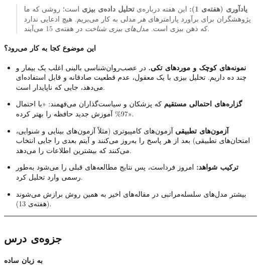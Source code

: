 \begin{quote}
\textbf{یادآوری (هفته‌ی 1):} این هفته درباره‌ی \textbf{تحلیل داده‌ی بیزی}
است؛ روشی که ما پژوهشگران برای برآورد پارامترهای \emph{هر} مدلی به کار
می‌بریم. هیچ ادعایی ندارد که ذهن بیزی است. \emph{مدل‌های بیزی شناخت} در
هفته‌ی 15 می‌آیند.
\end{quote}

\paragraph{این موضوع کجا به کار می‌رود؟}

\begin{itemize}
\tightlist
\item
  \textbf{نمونه‌های کوچک و موردهای تکی.} در عصب‌روان‌شناسی بالینی اغلب یک
  بیمار و چند ده  داریم. تحلیل بیزی با یک  معقول،
  عدم قطعیت صادقانه و قابل استفاده‌ای می‌دهد، جایی که  ناپایدار
  است.
\item
  \textbf{گزاره‌های احتمالی مستقیم} که پزشکان و سیاست‌گذاران می‌فهمند: «با
  احتمال 97\% آموزش جدید حافظه را بهتر کرده».
\item
  \textbf{آزمون‌های تطبیقی } آزمون‌های کامپیوتری
  (مثلاً آزمون‌های بینایی و شنوایی، امتحان‌های تطبیقی) بعد از هر پاسخ
   را به‌روز می‌کنند و آیتم بعدی را جایی انتخاب می‌کنند که
  بیشترین اطلاعات را می‌دهد.
\item
  \textbf{ترکیب شواهد:}  امروز  فرداست، پس نتایج
  مطالعه‌های قبلی را می‌شود به‌طور رسمی وارد تحلیل کرد.
\item
  بیشتر مدل‌های سلسله‌مراتبی در مقاله‌های اخیر به همین روش برازش می‌شوند
  (هفته‌ی 13).
\end{itemize}

\begin{center}\rule{0.5\linewidth}{0.5pt}\end{center}


\subsection{جزوه‌ی درس}

\paragraph{به زبان ساده}

